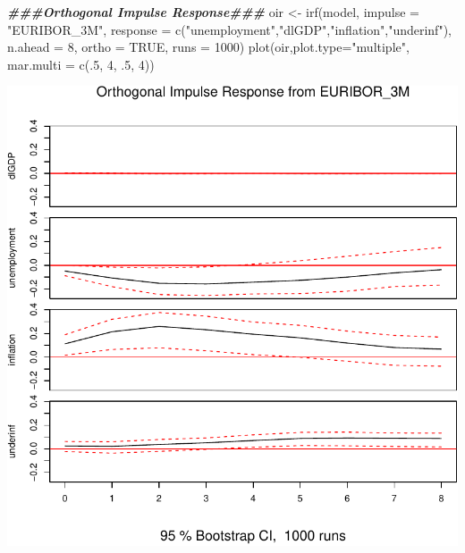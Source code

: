 \documentclass[
  10pt,
  ,
  french,
  a4paper]{article}
\newenvironment{Shaded}{\begin{snugshade}}{\end{snugshade}}
\newcommand{\AttributeTok}[1]{\textcolor[rgb]{0.77,0.63,0.00}{#1}}
\newcommand{\ConstantTok}[1]{\textcolor[rgb]{0.00,0.00,0.00}{#1}}
\newcommand{\DecValTok}[1]{\textcolor[rgb]{0.00,0.00,0.81}{#1}}
\newcommand{\DocumentationTok}[1]{\textcolor[rgb]{0.56,0.35,0.01}{\textbf{\textit{#1}}}}
\newcommand{\FunctionTok}[1]{\textcolor[rgb]{0.00,0.00,0.00}{#1}}
\newcommand{\NormalTok}[1]{#1}
\newcommand{\OtherTok}[1]{\textcolor[rgb]{0.56,0.35,0.01}{#1}}
\newcommand{\StringTok}[1]{\textcolor[rgb]{0.31,0.60,0.02}{#1}}
\begin{document}
\begin{Shaded}
\begin{Highlighting}[]
\DocumentationTok{\#\#\#Orthogonal Impulse Response\#\#\#}
\NormalTok{oir }\OtherTok{\textless{}{-}} \FunctionTok{irf}\NormalTok{(model, }\AttributeTok{impulse =} \StringTok{"EURIBOR\_3M"}\NormalTok{,}
           \AttributeTok{response =} \FunctionTok{c}\NormalTok{(}\StringTok{"unemployment"}\NormalTok{,}\StringTok{"dlGDP"}\NormalTok{,}\StringTok{"inflation"}\NormalTok{,}\StringTok{"underinf"}\NormalTok{),}
           \AttributeTok{n.ahead =} \DecValTok{8}\NormalTok{, }\AttributeTok{ortho =} \ConstantTok{TRUE}\NormalTok{, }\AttributeTok{runs =} \DecValTok{1000}\NormalTok{)}
\FunctionTok{plot}\NormalTok{(oir,}\AttributeTok{plot.type=}\StringTok{"multiple"}\NormalTok{,}
     \AttributeTok{mar.multi =} \FunctionTok{c}\NormalTok{(.}\DecValTok{5}\NormalTok{, }\DecValTok{4}\NormalTok{, .}\DecValTok{5}\NormalTok{, }\DecValTok{4}\NormalTok{))}
\end{Highlighting}
\end{Shaded}

\includegraphics{img/markdown-unnamed-chunk-1-2.pdf}
\end{document}
